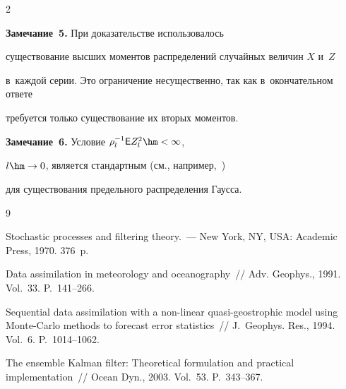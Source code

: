 \begin{multicols}{2}
\smallskip



\noindent

\textbf{Замечание~5.} При доказательстве использовалось

существование высших моментов распределений случайных величин $X$ и~$Z$

в~каждой серии. Это ограничение несущественно, так как  в~окончательном ответе

требуется только существование их вторых моментов.



\smallskip



\noindent

\textbf{Замечание~6.} Условие $\rho_l^{-1} {\sf E}Z_l^2 \hm< \infty$,

$l \hm\rightarrow 0$, является стандартным (см., например,~\cite{Gikhman})

для существования предельного распределения Гаусса.



{\small\frenchspacing

 {%


 \begin{thebibliography}{9}


 Stochastic processes and filtering theory.~--- New York, NY, USA: Academic Press, 1970. 376~p.




 Data assimilation in meteorology and oceanography~// Adv. Geophys., 1991. Vol.~33. P.~141--266.




 Sequential data assimilation with a non-linear quasi-geostrophic model using Monte-Carlo methods to forecast error statistics~// J.~Geophys. Res., 1994. Vol.~6. P.~1014--1062.




 The ensemble Kalman filter: Theoretical formulation and practical implementation~// Ocean Dyn., 2003. Vol.~53. P.~343--367.





\end{thebibliography}}}
\end{multicols}
